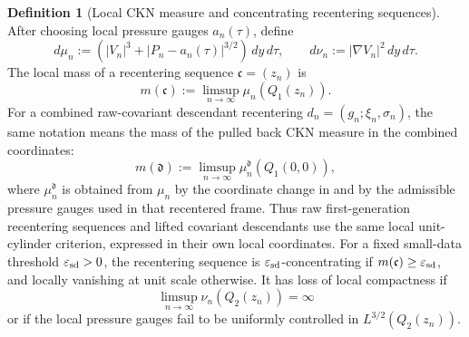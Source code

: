 \documentclass[11pt]{amsart}
\numberwithin{equation}{section}
\theoremstyle{plain}
\theoremstyle{definition}
\newtheorem{definition}[theorem]{Definition}
\theoremstyle{remark}
\newcommand{\eps}{\varepsilon}
\begin{document}
\begin{definition}[Local CKN measure and concentrating recentering sequences]
\label{def:terminal-measures}
After choosing local pressure gauges \(a_n(\tau)\), define
\[
   d\mu_n
   :=
   \left(|V_n|^3+|P_n-a_n(\tau)|^{3/2}\right)\,dy\,d\tau,
   \qquad
   d\nu_n:=|\nabla V_n|^2\,dy\,d\tau .
\]
The local mass of a recentering sequence \(\mathfrak c=(z_n)\) is
\[
   m(\mathfrak c):=\limsup_{n\to\infty}\mu_n(Q_1(z_n)).
\]
For a combined raw-covariant descendant recentering
\(d_n=(g_n;\xi_n,\sigma_n)\), the same notation means the mass of the pulled
back CKN measure in the combined coordinates:
\[
   m(\mathfrak d):=
   \limsup_{n\to\infty}\mu_n^{\mathfrak d}(Q_1(0,0)),
\]
where \(\mu_n^{\mathfrak d}\) is obtained from \(\mu_n\) by the coordinate
change in  and by the admissible
pressure gauges used in that recentered frame.  Thus raw first-generation
recentering sequences and lifted covariant descendants use the same local
unit-cylinder criterion, expressed in their own local coordinates.
For a fixed small-data threshold \(\eps_{\rm sd}>0\), the recentering sequence
is \(\eps_{\rm sd}\)-concentrating if \(m(\mathfrak c)\ge\eps_{\rm sd}\), and
locally vanishing at unit scale otherwise.  It has loss of local compactness if
\[
   \limsup_{n\to\infty}\nu_n(Q_2(z_n))=\infty
\]
or if the local pressure gauges fail to be uniformly controlled in
\(L^{3/2}(Q_2(z_n))\).
\end{definition}
\end{document}
